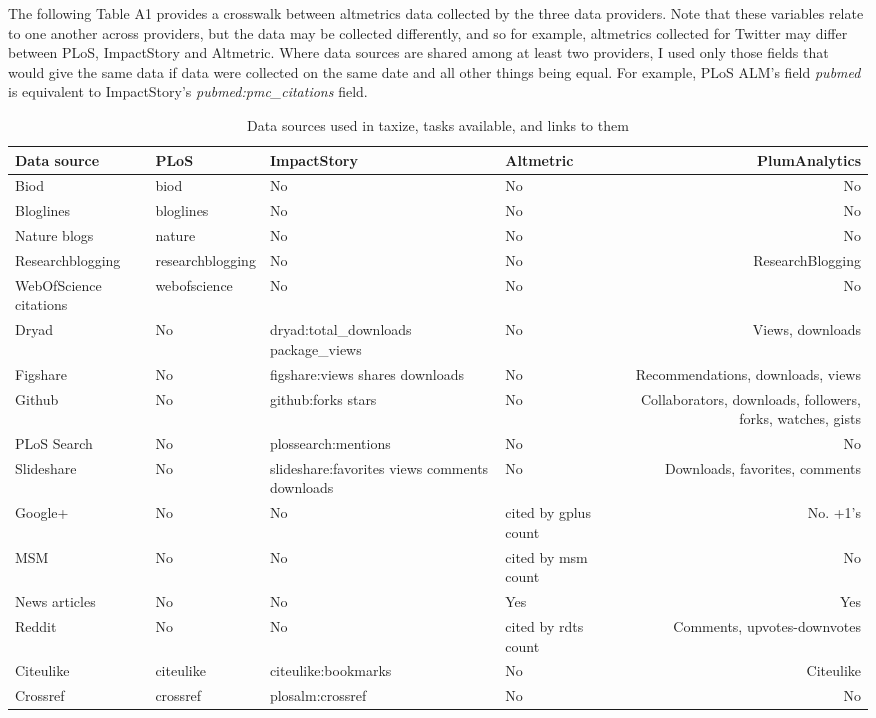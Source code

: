 \documentclass[letterpaper,superscriptaddress,showkeys,longbibliography]{revtex4-1}\usepackage{graphicx, color}
\begin{document}
The following Table A1 provides a crosswalk between altmetrics data collected by the three data providers. Note that these variables relate to one another across providers, but the data may be collected differently, and so for example, altmetrics collected for Twitter may differ between PLoS, ImpactStory and Altmetric. Where data sources are shared among at least two providers, I used only those fields that would give the same data if data were collected on the same date and all other things being equal. For example, PLoS ALM's field \emph{pubmed} is equivalent to ImpactStory's \emph{pubmed:pmc\_citations} field.

\begin{table}[!ht]
\begin{threeparttable}[b]
\caption{Data sources used in taxize, tasks available, and links to them}
\begin{tabular}[t]{|B|B|B|B|D|}
\hline
Data source & PLoS & ImpactStory & Altmetric & PlumAnalytics \\
\hline
Biod & biod & No & No & No \\
Bloglines & bloglines & No & No & No \\
Nature blogs & nature & No & No & No\\
Researchblogging & researchblogging & No & No & ResearchBlogging \\
WebOfScience citations & webofscience & No & No & No \\
Dryad & No & dryad:total\_downloads package\_views & No & Views, downloads \\
Figshare & No & figshare:views shares downloads & No & Recommendations, downloads, views \\
Github & No & github:forks stars & No & Collaborators, downloads, followers, forks, watches, gists \\
PLoS Search & No & plossearch:mentions & No & No \\
Slideshare & No & slideshare:favorites views comments downloads & No & Downloads, favorites, comments \\
Google+ & No & No & cited by gplus count & No. +1's \\
MSM & No & No & cited by msm count & No \\
News articles & No & No & Yes & Yes \\
Reddit & No & No & cited by rdts count & Comments, upvotes-downvotes \\
Citeulike & citeulike & citeulike:bookmarks & No & Citeulike \\
Crossref & crossref & plosalm:crossref & No & No \\

\end{tabular}
\end{threeparttable}
\end{table}
\end{document}
